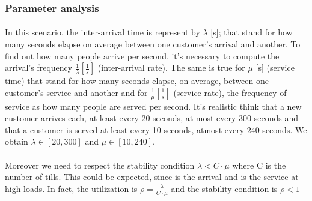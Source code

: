 \subsubsection{Parameter analysis}
\paragraph{} 
In this scenario, the inter-arrival time is represent by $\lambda$ [s]; that stand for how many seconds elapse on average between one customer's arrival and another. To find out how many people arrive per second, it's necessary to compute the arrival's frequency $\frac{1}{\lambda} [\frac{1}{s}]$ (inter-arrival rate). The same is true for $\mu$ [s] (service time) that stand for how many seconds elapse, on average, between one customer's service and another and for $\frac{1}{\mu} [\frac{1}{s}]$ (service rate), the frequency of service as how many people are served per second. It's realistic think that a new customer arrives each, at least every 20 seconds, at most every 300 seconds and that a customer is served at least every 10 seconds, atmost every 240 seconds. We obtain $\lambda \in [20, 300]$ and $\mu \in [10, 240]$. \\
\paragraph{} Moreover we need to respect the stability condition $\lambda < C\cdot \mu$ where C is the number of tills. This could be expected, since \lambda is the arrival and \mu is the service at high loads. In fact, the utilization is $\rho = \frac{\lambda }{C\cdot \mu}$ and the stability condition is $\rho < 1$  


